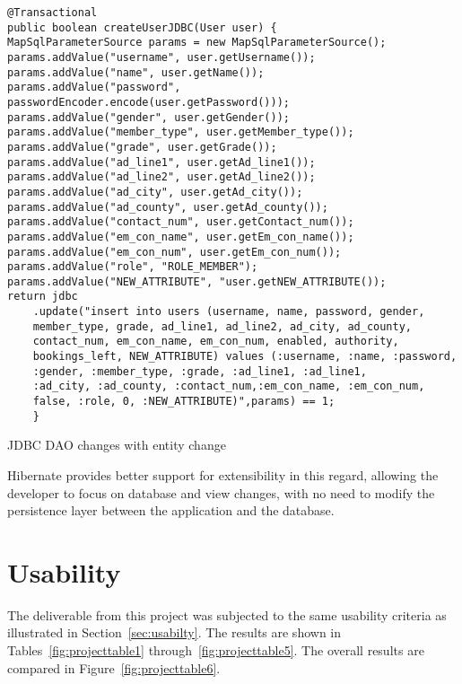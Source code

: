 \begin{lstlisting}
@Transactional
public boolean createUserJDBC(User user) {
MapSqlParameterSource params = new MapSqlParameterSource();
params.addValue("username", user.getUsername());
params.addValue("name", user.getName());
params.addValue("password", passwordEncoder.encode(user.getPassword()));
params.addValue("gender", user.getGender());
params.addValue("member_type", user.getMember_type());
params.addValue("grade", user.getGrade());
params.addValue("ad_line1", user.getAd_line1());
params.addValue("ad_line2", user.getAd_line2());
params.addValue("ad_city", user.getAd_city());
params.addValue("ad_county", user.getAd_county());
params.addValue("contact_num", user.getContact_num());
params.addValue("em_con_name", user.getEm_con_name());
params.addValue("em_con_num", user.getEm_con_num());
params.addValue("role", "ROLE_MEMBER");
params.addValue("NEW_ATTRIBUTE", "user.getNEW_ATTRIBUTE());
return jdbc
	.update("insert into users (username, name, password, gender, 
	member_type, grade, ad_line1, ad_line2, ad_city, ad_county,
	contact_num, em_con_name, em_con_num, enabled, authority,
	bookings_left, NEW_ATTRIBUTE) values (:username, :name, :password, 
	:gender, :member_type, :grade, :ad_line1, :ad_line1, 
	:ad_city, :ad_county, :contact_num,:em_con_name, :em_con_num,
	false, :role, 0, :NEW_ATTRIBUTE)",params) == 1;
	}
\end{lstlisting}
\begin{table}[H]
\caption{JDBC DAO changes with entity change}
\label{fig:jdbcChanges}
\end{table}

Hibernate provides better support for extensibility in this regard, allowing the developer to focus on database and view changes, with no need to modify the persistence layer between the application and the database.

\section{Usability}

The deliverable from this project was subjected to the same usability criteria as illustrated in Section~\ref{sec:usabilty}. The results are shown in Tables~\ref{fig:projecttable1} through~\ref{fig:projecttable5}. The overall results are compared in Figure~\ref{fig:projecttable6}.

